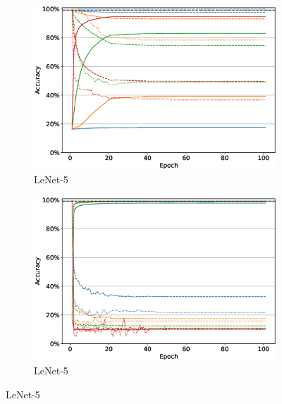 \begin{figure}
\begin{subfigure}[b]{0.49\textwidth}
         \centering
         \includegraphics[width=\textwidth]{images/finetuning/finetuning_protecting_content_smalllr_thesis_lenet5.eps}
         \caption{LeNet-5}
         \label{fig:finetuning_lenet5_smalllr}
     \end{subfigure}
     \hfill
     \begin{subfigure}[b]{0.49\textwidth}
         \centering
         \includegraphics[width=\textwidth]{images/finetuning/finetuning_protecting_content_largelr_thesis_lenet5.eps}
         \caption{LeNet-5}
         \label{fig:finetuning_lenet5_largelr}
     \end{subfigure}
     \hfill
     

\end{figure}
